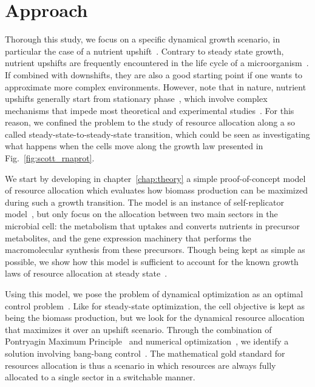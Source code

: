 \section{Approach}
\label{sec:approach}

Thorough this study, we focus on a specific dynamical growth scenario, in particular the case of a nutrient upshift~\cite{ehrenberg_mediumdependent_2012,kjeldgaard_kinetics_1961,schaechter_patterns_1961,johnsen_control_1977}.
Contrary to steady state growth, nutrient upshifts are frequently encountered in the life cycle of a microorganism~\cite{schaechter_microbe_2006,mcarthur_microbial_2006,menge_nitrogen_2012,hobbie_microbes_2013}.
If combined with downshifts, they are also a good starting point if one wants to approximate more complex environments.
However, note that in nature, nutrient upshifts generally start from stationary phase~\cite{mcarthur_microbial_2006,menge_nitrogen_2012,hobbie_microbes_2013}, which involve complex mechanisms that impede most theoretical and experimental studies~\cite{stragier_molecular_1996,gonzalez-pastor_cannibalism:_2011,ng_damage_1962,dufrenne_effect_1997,shaw_effect_1967,mcmeekin_predictive_2002,cheroutre-vialette_application_2002}.
For this reason, we confined the problem to the study of resource allocation along a so called steady-state-to-steady-state transition, which could be seen as investigating what happens when the cells move along the growth law presented in Fig.~\ref{fig:scott_rnaprot}.

We start by developing in chapter~\ref{chap:theory} a simple proof-of-concept model of resource allocation which evaluates how biomass production can be maximized during such a growth transition.
The model is an instance of self-replicator model~\cite{molenaar_shifts_2009}, but only focus on the allocation between two main sectors in the microbial cell: the metabolism that uptakes and converts nutrients in precursor metabolites, and the gene expression machinery that performs the macromolecular synthesis from these precursors.
Though being kept as simple as possible, we show how this model is sufficient to account for the known growth laws of resource allocation at steady state~\cite{scott_interdependence_2010,scott_bacterial_2011}.

Using this model, we pose the problem of dynamical optimization as an optimal control problem~\cite{stengel_optimal_1994}.
Like for steady-state optimization, the cell objective is kept as being the biomass production, but we look for the dynamical resource allocation that maximizes it over an upshift scenario.
Through the combination of Pontryagin Maximum Principle~\cite{carlson_infinite_1991} and numerical optimization~\cite{bonnans_bocop_2012}, we identify a solution involving bang-bang control~\cite{stengel_optimal_1994}.
The mathematical gold standard for resources allocation is thus a scenario in which resources are always fully allocated to a single sector in a switchable manner.

